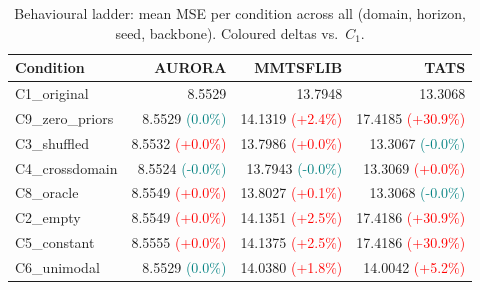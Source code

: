 \begin{table}[t]
\caption{Behavioural ladder: mean MSE per condition across all (domain, horizon, seed, backbone). Coloured deltas vs.\ $C_1$.}
\label{tab:ladder}
\centering
\small
\begin{tabular}{lrrr}
\toprule
Condition & AURORA & MMTSFLIB & TATS \\
\midrule
C1\_original & 8.5529 & 13.7948 & 13.3068 \\
C9\_zero\_priors & 8.5529 {\tiny\textcolor{teal}{(0.0\%)}} & 14.1319 {\tiny\textcolor{red}{(+2.4\%)}} & 17.4185 {\tiny\textcolor{red}{(+30.9\%)}} \\
C3\_shuffled & 8.5532 {\tiny\textcolor{red}{(+0.0\%)}} & 13.7986 {\tiny\textcolor{red}{(+0.0\%)}} & 13.3067 {\tiny\textcolor{teal}{(-0.0\%)}} \\
C4\_crossdomain & 8.5524 {\tiny\textcolor{teal}{(-0.0\%)}} & 13.7943 {\tiny\textcolor{teal}{(-0.0\%)}} & 13.3069 {\tiny\textcolor{red}{(+0.0\%)}} \\
C8\_oracle & 8.5549 {\tiny\textcolor{red}{(+0.0\%)}} & 13.8027 {\tiny\textcolor{red}{(+0.1\%)}} & 13.3068 {\tiny\textcolor{teal}{(-0.0\%)}} \\
C2\_empty & 8.5549 {\tiny\textcolor{red}{(+0.0\%)}} & 14.1351 {\tiny\textcolor{red}{(+2.5\%)}} & 17.4186 {\tiny\textcolor{red}{(+30.9\%)}} \\
C5\_constant & 8.5555 {\tiny\textcolor{red}{(+0.0\%)}} & 14.1375 {\tiny\textcolor{red}{(+2.5\%)}} & 17.4186 {\tiny\textcolor{red}{(+30.9\%)}} \\
C6\_unimodal & 8.5529 {\tiny\textcolor{teal}{(0.0\%)}} & 14.0380 {\tiny\textcolor{red}{(+1.8\%)}} & 14.0042 {\tiny\textcolor{red}{(+5.2\%)}} \\
\bottomrule
\end{tabular}
\end{table}